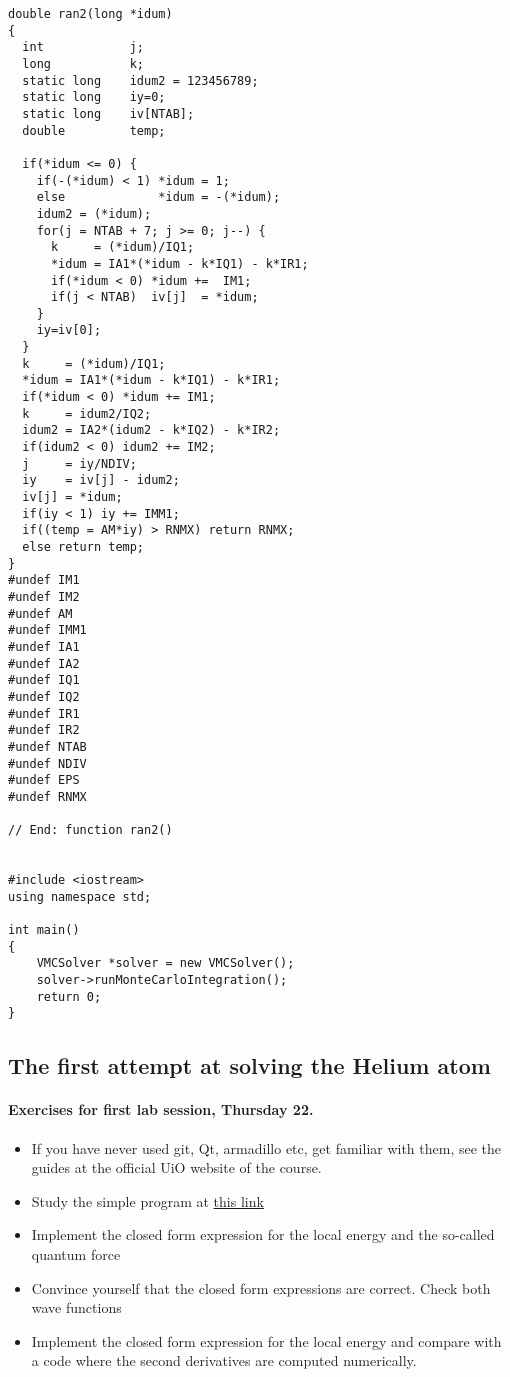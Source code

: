 \documentclass[%
twoside,                 %
final,                   %
10pt]{article}
\begin{document}
\begin{verbatim}
double ran2(long *idum)
{
  int            j;
  long           k;
  static long    idum2 = 123456789;
  static long    iy=0;
  static long    iv[NTAB];
  double         temp;

  if(*idum <= 0) {
    if(-(*idum) < 1) *idum = 1;
    else             *idum = -(*idum);
    idum2 = (*idum);
    for(j = NTAB + 7; j >= 0; j--) {
      k     = (*idum)/IQ1;
      *idum = IA1*(*idum - k*IQ1) - k*IR1;
      if(*idum < 0) *idum +=  IM1;
      if(j < NTAB)  iv[j]  = *idum;
    }
    iy=iv[0];
  }
  k     = (*idum)/IQ1;
  *idum = IA1*(*idum - k*IQ1) - k*IR1;
  if(*idum < 0) *idum += IM1;
  k     = idum2/IQ2;
  idum2 = IA2*(idum2 - k*IQ2) - k*IR2;
  if(idum2 < 0) idum2 += IM2;
  j     = iy/NDIV;
  iy    = iv[j] - idum2;
  iv[j] = *idum;
  if(iy < 1) iy += IMM1;
  if((temp = AM*iy) > RNMX) return RNMX;
  else return temp;
}
#undef IM1
#undef IM2
#undef AM
#undef IMM1
#undef IA1
#undef IA2
#undef IQ1
#undef IQ2
#undef IR1
#undef IR2
#undef NTAB
#undef NDIV
#undef EPS
#undef RNMX

// End: function ran2()


#include <iostream>
using namespace std;

int main()
{
    VMCSolver *solver = new VMCSolver();
    solver->runMonteCarloIntegration();
    return 0;
}
\end{verbatim}




\subsection*{The first attempt at solving the Helium atom}

\paragraph{Exercises for first lab session, Thursday 22.}

\begin{itemize}
 \item If you have never used git, Qt, armadillo etc, get familiar with them, see the guides at the official UiO website of the course.

 \item Study the simple program at \href{{https://github.com/CompPhysics/ComputationalPhysics2/tree/gh-pages/doc/pub/vmc/programs/}}{this link}

 \item Implement the closed form expression for the local energy and the so-called quantum force

 \item Convince yourself that the closed form expressions are correct. Check both wave functions

 \item Implement the closed form expression for the local energy and compare with a code where the second derivatives are computed numerically.
\end{itemize}
\end{document}
